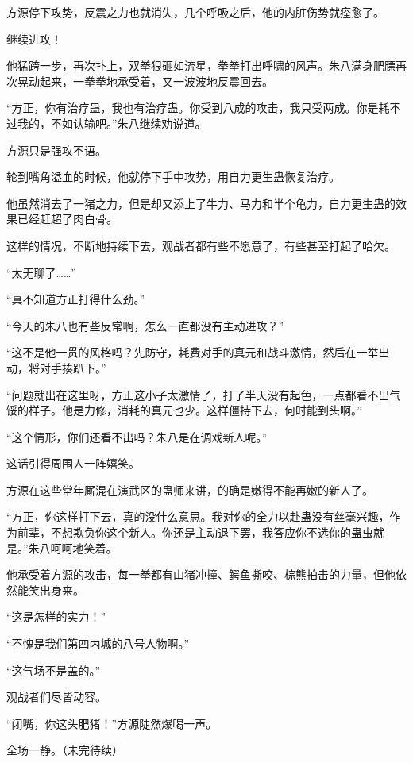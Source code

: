 \begin{this_body}
方源停下攻势，反震之力也就消失，几个呼吸之后，他的内脏伤势就痊愈了。

继续进攻！

他猛跨一步，再次扑上，双拳狠砸如流星，拳拳打出呼啸的风声。朱八满身肥膘再次晃动起来，一拳拳地承受着，又一波波地反震回去。

“方正，你有治疗蛊，我也有治疗蛊。你受到八成的攻击，我只受两成。你是耗不过我的，不如认输吧。”朱八继续劝说道。

方源只是强攻不语。

轮到嘴角溢血的时候，他就停下手中攻势，用自力更生蛊恢复治疗。

他虽然消去了一猪之力，但是却又添上了牛力、马力和半个龟力，自力更生蛊的效果已经赶超了肉白骨。

这样的情况，不断地持续下去，观战者都有些不愿意了，有些甚至打起了哈欠。

“太无聊了……”

“真不知道方正打得什么劲。”

“今天的朱八也有些反常啊，怎么一直都没有主动进攻？”

“这不是他一贯的风格吗？先防守，耗费对手的真元和战斗激情，然后在一举出动，将对手揍趴下。”

“问题就出在这里呀，方正这小子太激情了，打了半天没有起色，一点都看不出气馁的样子。他是力修，消耗的真元也少。这样僵持下去，何时能到头啊。”

“这个情形，你们还看不出吗？朱八是在调戏新人呢。”

这话引得周围人一阵嬉笑。

方源在这些常年厮混在演武区的蛊师来讲，的确是嫩得不能再嫩的新人了。

“方正，你这样打下去，真的没什么意思。我对你的全力以赴蛊没有丝毫兴趣，作为前辈，不想欺负你这个新人。你还是主动退下罢，我答应你不选你的蛊虫就是。”朱八呵呵地笑着。

他承受着方源的攻击，每一拳都有山猪冲撞、鳄鱼撕咬、棕熊拍击的力量，但他依然能笑出身来。

“这是怎样的实力！”

“不愧是我们第四内城的八号人物啊。”

“这气场不是盖的。”

观战者们尽皆动容。

“闭嘴，你这头肥猪！”方源陡然爆喝一声。

全场一静。（未完待续）

\end{this_body}

